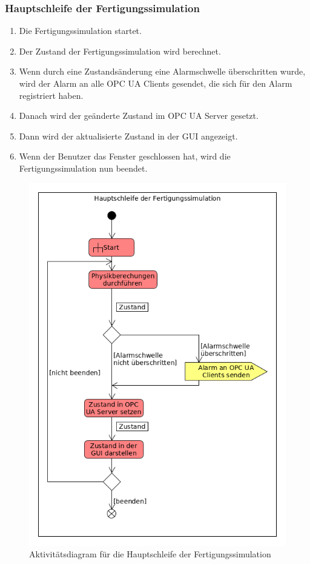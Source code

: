 \documentclass[parskip=full]{scrartcl}
\begin{document}
\subsubsection{Hauptschleife der Fertigungssimulation}
\begin{enumerate}[noitemsep]
 \item Die Fertigungssimulation startet.
 \item Der Zustand der \gls{Fertigungssimulation} wird berechnet.
 \item Wenn durch eine Zustandsänderung eine Alarmschwelle überschritten wurde, wird der Alarm an alle \glspl{OPC UA Client} gesendet,
 die sich für den Alarm registriert haben.
 \item Danach wird der geänderte Zustand im \gls{OPC UA Server} gesetzt.
 \item Dann wird der aktualisierte Zustand in der \gls{GUI} angezeigt.
 \item Wenn der Benutzer das Fenster geschlossen hat, wird die \gls{Fertigungssimulation} nun beendet.
\end{enumerate}
\begin{figure}[h!]
  \centering
  \includegraphics[scale=0.62]{media/Activities/main-simulation.png}
  \caption{Aktivitätsdiagram für die Hauptschleife der Fertigungssimulation}
\end{figure}
\end{document}
